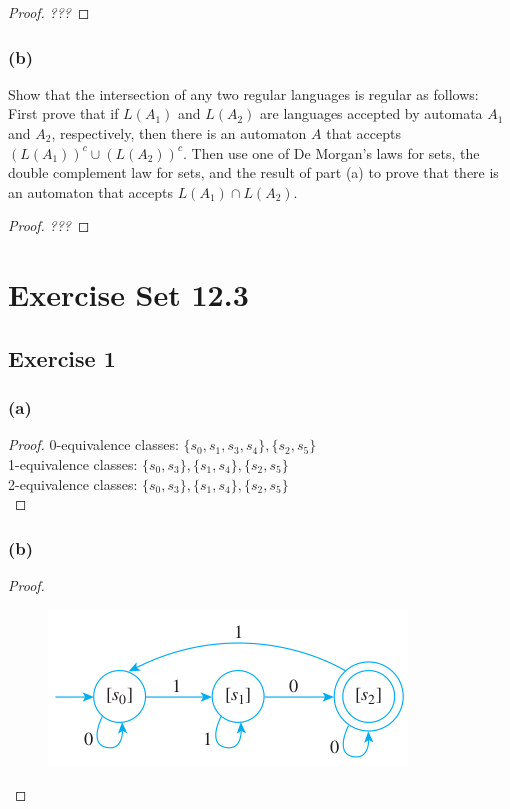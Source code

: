 \documentclass[14pt]{extarticle}
\begin{document}
\begin{proof}
{\it ???}
\end{proof}

\subsubsection{(b)}
Show that the intersection of any two regular languages is regular as follows: First prove that if \(L(A_1)\) and 
\(L(A_2)\) are languages accepted by automata \(A_1\) and \(A_2\), respectively, then there is an automaton \(A\) that 
accepts \((L(A_1))^c \cup (L(A_2))^c\). Then use one of De Morgan’s laws for sets, the double complement law for sets, 
and the result of part (a) to prove that there is an automaton that accepts \(L(A_1) \cap L(A_2)\).

\begin{proof}
{\it ???}
\end{proof}

\section{Exercise Set 12.3}
\subsection{Exercise 1}

\subsubsection{(a)}

\begin{proof}
0-equivalence classes: \(\{s_0, s_1, s_3, s_4\}, \{s_2, s_5\}\) \\
1-equivalence classes: \(\{s_0, s_3\}, \{s_1, s_4\}, \{s_2, s_5\}\) \\
2-equivalence classes: \(\{s_0, s_3\}, \{s_1, s_4\}, \{s_2, s_5\}\) \\
\end{proof}

\subsubsection{(b)}

\begin{proof}
\begin{figure}[ht!]
\centering
\includegraphics[scale=0.5]{../images/12.3.1.b.png}
\end{figure}
\end{proof}
\end{document}
